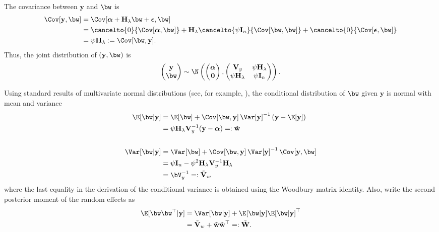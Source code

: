 \documentclass[english, 11pt]{article}
\begin{document}
The covariance between $\mathbf y$ and $\bw$ is
\begin{align*}
\Cov[\mathbf y, \bw] &= \Cov[\boldsymbol\alpha + \mathbf H_\lambda \bw + \boldsymbol\epsilon, \bw] \\
&= \cancelto{0}{\Cov[\boldsymbol\alpha, \bw]} + \mathbf H_{\lambda} \cancelto{\psi\mathbf I_n}{\Cov[\bw, \bw]} +  \cancelto{0}{\Cov[\boldsymbol\epsilon, \bw]} \\
&= \psi\mathbf H_{\lambda} := \Cov[\bw, \mathbf y].
\end{align*}
Thus, the joint distribution of $(\mathbf y, \bw)$ is
\[
	\begin{pmatrix}
		\mathbf y \\
		\bw
	\end{pmatrix}
	\sim \N \left(
	\begin{pmatrix}
		\boldsymbol{\alpha} \\
		\mathbf 0
	\end{pmatrix},
	\begin{pmatrix}
		\mathbf V_y				&\psi\mathbf H_{\lambda} \\
		\psi\mathbf H_{\lambda}	&\psi\mathbf I_n
	\end{pmatrix}
	\right).
\]

Using standard results of multivariate normal distributions (see, for example, \citealt{krzanowski2000principles}), the conditional distribution of $\bw$ given $\mathbf y$ is normal with mean and variance
\begin{align}\label{eq:wcondy}
\E[\bw|\mathbf y] &= \E[\bw] + \Cov[\bw, \mathbf y] \, \Var[\mathbf y]^{-1} \, (\mathbf y - \E[\mathbf y]) \nonumber  \\
&= \psi\mathbf H_{\lambda} \mathbf V_y^{-1} (\mathbf y - \boldsymbol\alpha) =: \wtilde \nonumber \\
\\
\Var[\bw|\mathbf y] &= \Var[\bw] + \Cov[\bw, \mathbf y] \, \Var[\mathbf y]^{-1} \, \Cov[\mathbf y, \bw] \nonumber \\
&= \psi\mathbf I_n - \psi^2\mathbf H_{\lambda} \mathbf V_y^{-1} \mathbf H_{\lambda} \nonumber \\
&= \bV_y^{-1} =: \Vtilde_w \nonumber
\end{align}
where the last equality in the derivation of the conditional variance is obtained using the Woodbury matrix identity. Also, write the second posterior moment of the random effects as
\begin{equation}
\begin{aligned}\label{eq:Wtilde}
	\E[\bw\bw^\top|\mathbf y] &= \Var[\bw|\mathbf y] + \E[\bw|\mathbf y]\E[\bw|\mathbf y]^\top \\
	&= \Vtilde_w + \wtilde\wtilde^\top =: \Wtilde.
\end{aligned}
\end{equation}
	
\end{document}
